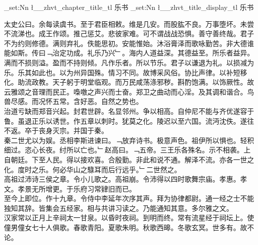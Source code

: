 \documentclass{zhvt-classic}
\begin{document}
\clearpage
\ExplSyntaxOn
\tl_set:Nn \l__zhvt_chapter_title_tl { 乐书 }
\tl_set:Nn \l__zhvt_title_display_tl { 乐书 }
\ExplSyntaxOff
\maketitle






\hspace*{2em}太史公曰。余每读虞书。至于君臣相敕。维是几安。而股肱不良。万事堕坏。未尝不流涕也。成王作颂。推己惩艾。悲彼家难。可不谓战战恐惧。善守善终哉。君子不为约则修德。满则弃礼。佚能思初。安能惟始。沐浴膏泽而歌咏勤苦。非大德谁能如斯。传曰﹁治定功成。礼乐乃兴﹂。海内人道益深。其德益至。所乐者益异。满而不损则溢。盈而不持则倾。凡作乐者。所以节乐。君子以谦退为礼。以损减为乐。乐其如此也。以为州异国殊。情习不同。故博采风俗。协比声律。以补短移化。助流政教。天子躬于明堂临观。而万民咸荡涤邪秽。斟酌饱满。以饰厥性。故云雅颂之音理而民正。嘄噭之声兴而士奋。郑卫之曲动而心淫。及其调和谐合。鸟兽尽感。而况怀五常。含好恶。自然之势也。\\
\hspace*{2em}治道亏缺而郑音兴起。封君世辟。名显邻州。争以相高。自仲尼不能与齐优遂容于鲁。虽退正乐以诱世。作五章以刺时。犹莫之化。陵迟以至六国。流沔沈佚。遂往不返。卒于丧身灭宗。并国于秦。\\
\hspace*{2em}秦二世尤以为娱。丞相李斯进谏曰。﹁放弃诗书。极意声色。祖伊所以惧也。轻积细过。恣心长夜。纣所以亡也。﹂赵高曰。﹁五帝。三王乐各殊名。示不相袭。上自朝廷。下至人民。得以接欢喜。合殷勤。非此和说不通。解泽不流。亦各一世之化。度时之乐。何必华山之騄耳而后行远乎。﹂二世然之。\\
\hspace*{2em}高祖过沛诗三侯之章。令小儿歌之。高祖崩。令沛得以四时歌舞宗庙。孝惠。孝文。孝景无所增更。于乐府习常肄旧而已。\\
\hspace*{2em}至今上即位。作十九章。令侍中李延年次序其声。拜为协律都尉。通一经之士不能独知其辞。皆集会五经家。相与共讲习读之。乃能通知其意。多尔雅之文。\\
\hspace*{2em}汉家常以正月上辛祠太一甘泉。以昏时夜祠。到明而终。常有流星经于祠坛上。使僮男僮女七十人俱歌。春歌青阳。夏歌朱明。秋歌西暤。冬歌玄冥。世多有。故不论。\\
\end{document}
